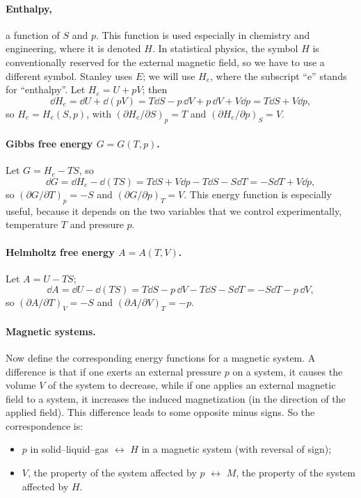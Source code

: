 \paragraph{Enthalpy,} a function of $S$ and $p$. This function is used especially in
chemistry and engineering, where it is denoted $H$. In statistical physics, the symbol $H$
is conventionally reserved for the external magnetic field, so we have to use a different
symbol. Stanley uses $E$; we will use $H_e$, where the subscript ``e'' stands for
``enthalpy''. Let $H_e = U + pV$; then
\begin{equation}
  \dd H_e = \dd U + \dd(pV) = T\dd S - p\,\dd V + p\,\dd V + V\dd p = T\dd S + V\dd p,
\end{equation}
so $H_e = H_e(S,p)$, with $(\partial H_e/\partial S)_p = T$ and
$(\partial H_e/\partial p)_S = V$.

\paragraph{Gibbs free energy $G = G(T,p)$.} Let $G = H_e - TS$, so
\begin{equation}
  \dd G = \dd H_e - \dd(TS) = T\dd S + V\dd p - T\dd S - S\dd T = -S\dd T + V\dd p,
\end{equation}
so $(\partial G/\partial T)_p = -S$ and $(\partial G/\partial p)_T = V$. This energy
function is especially useful, because it depends on the two variables that we control
experimentally, temperature $T$ and pressure $p$.

\paragraph{Helmholtz free energy $A = A(T,V)$.} Let $A = U - TS$;
\begin{equation}
  \dd A = \dd U - \dd(TS) = T\dd S - p\,\dd V - T\dd S - S\dd T = -S\dd T - p\,\dd V,
\end{equation}
so $(\partial A/\partial T)_V = -S$ and $(\partial A/\partial V)_T = -p$.

\paragraph{Magnetic systems.} Now define the corresponding energy functions for a magnetic
system. A difference is that if one exerts an external pressure $p$ on a system, it causes
the volume $V$ of the system to decrease, while if one applies an external magnetic field
to a system, it increases the induced magnetization (in the direction of the applied
field). This difference leads to some opposite minus signs. So the correspondence is:
\begin{itemize}
  \item $p$ in solid--liquid--gas $\leftrightarrow$ $H$ in a magnetic system (with reversal
    of sign);
  \item $V$, the property of the system affected by $p$ $\leftrightarrow$ $M$, the property
    of the system affected by $H$.
\end{itemize}

